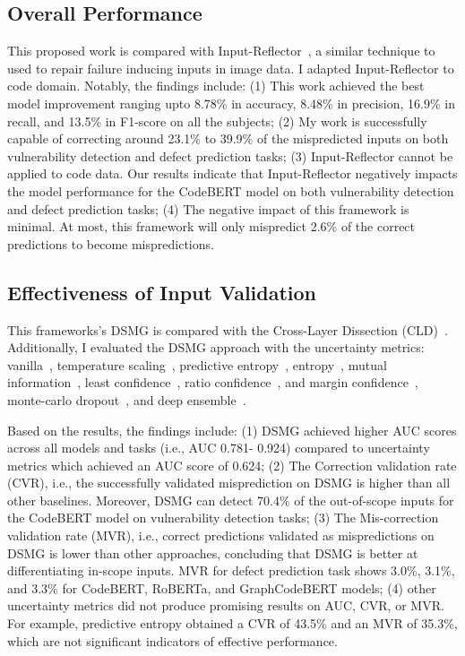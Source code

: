 \subsection{Overall Performance}
This proposed work is compared with Input-Reflector~\cite{xiao2022repairing}, a similar technique to used to repair failure inducing inputs in image data. I adapted Input-Reflector to code domain. Notably, the findings include: (1) This work achieved the best model improvement ranging upto 8.78\% in accuracy, 8.48\% in precision,
16.9\% in recall, and 13.5\% in F1-score on all the subjects; (2) My work is successfully capable of correcting around 23.1\% to 39.9\% of the mispredicted inputs on both vulnerability detection and defect prediction tasks; (3) Input-Reflector cannot be applied to code data. Our results indicate that Input-Reflector negatively impacts the model performance for the CodeBERT model on both vulnerability detection and defect prediction tasks; (4) The negative impact of this framework is minimal. At most, this framework will only mispredict 2.6\% of the correct predictions to become mispredictions. 

\subsection{Effectiveness of Input Validation}
\label{validation_results}

This frameworks’s DSMG is compared with the
Cross-Layer Dissection (CLD)~\cite{wang2020dissector}. Additionally, I evaluated the DSMG approach with the uncertainty metrics: vanilla~\cite{hendrycks2018baseline}, temperature scaling~\cite{guo2017calibration}, predictive entropy~\cite{steinhardt2016unsupervised,shannon1948mathematical}, entropy~\cite{steinhardt2016unsupervised,shannon1948mathematical}, mutual information~\cite{steinhardt2016unsupervised,shannon1948mathematical}, least confidence~\cite{monarch2021human}, ratio confidence~\cite{monarch2021human}, and margin confidence~\cite{monarch2021human}, monte-carlo dropout~\cite{gal2016dropout}, and deep ensemble~\cite{lakshminarayanan2017simple}. 

Based on the results, the findings include: (1) DSMG achieved higher AUC scores across all models and tasks (i.e., AUC 0.781- 0.924) compared to uncertainty metrics which achieved an AUC score of 0.624; (2) The Correction validation rate (CVR), i.e., the successfully validated misprediction on DSMG is higher than all other baselines. Moreover, DSMG can detect 70.4\% of the out-of-scope inputs for the CodeBERT model on vulnerability detection tasks; (3) The Mis-correction validation rate (MVR), i.e., correct predictions validated
as mispredictions on DSMG is lower than other approaches, concluding that DSMG is better
at differentiating in-scope inputs. MVR for defect prediction task shows 3.0\%, 3.1\%, and 3.3\% for CodeBERT, RoBERTa, and GraphCodeBERT models; (4) other uncertainty metrics did not produce promising results on AUC, CVR, or MVR. For example, predictive entropy obtained a CVR of 43.5\% and an MVR of 35.3\%, which are not significant indicators of effective performance.

